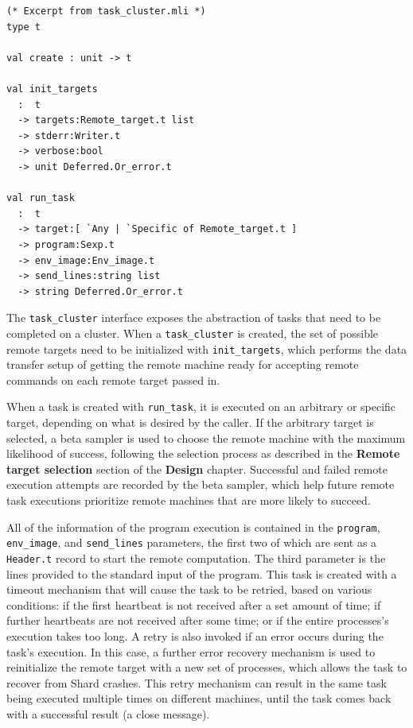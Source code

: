 \documentclass[oneside]{report}
\begin{document}
\begin{minipage}[c]{\textwidth-15pt}
  \begin{lstlisting}
(* Excerpt from task_cluster.mli *)
type t

val create : unit -> t

val init_targets
  :  t
  -> targets:Remote_target.t list
  -> stderr:Writer.t
  -> verbose:bool
  -> unit Deferred.Or_error.t

val run_task
  :  t
  -> target:[ `Any | `Specific of Remote_target.t ]
  -> program:Sexp.t
  -> env_image:Env_image.t
  -> send_lines:string list
  -> string Deferred.Or_error.t
\end{lstlisting}
  \smallskip
\end{minipage}

The \texttt{task\_cluster} interface exposes the abstraction of tasks that need to be completed on a cluster.
When a \texttt{task\_cluster} is created, the set of possible remote targets need to be initialized with \texttt{init\_targets}, which performs the data transfer setup of getting the remote machine ready for accepting remote commands on each remote target passed in.

When a task is created with \texttt{run\_task}, it is executed on an arbitrary or specific target, depending on what is desired by the caller.
If the arbitrary target is selected, a beta sampler is used to choose the remote machine with the maximum likelihood of success, following the selection process as described in the \textbf{Remote target selection} section of the \textbf{Design} chapter.
Successful and failed remote execution attempts are recorded by the beta sampler, which help future remote task executions prioritize remote machines that are more likely to succeed.

\begin{sloppypar}
  All of the information of the program execution is contained in the \texttt{program}, \texttt{env\_image}, and \texttt{send\_lines} parameters, the first two of which are sent as a \texttt{Header.t} record to start the remote computation. The third parameter is the lines provided to the standard input of the program.
  This task is created with a timeout mechanism that will cause the task to be retried, based on various conditions: if the first heartbeat is not received after a set amount of time; if further heartbeats are not received after some time; or if the entire processes's execution takes too long.
  A retry is also invoked if an error occurs during the task's execution.
  In this case, a further error recovery mechanism is used to reinitialize the remote target with a new set of processes, which allows the task to recover from Shard crashes.
  This retry mechanism can result in the same task being executed multiple times on different machines, until the task comes back with a successful result (a close message).
\end{sloppypar}
\end{document}
